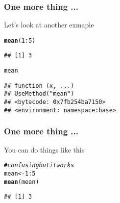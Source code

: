 \documentclass[12pt]{beamer}\usepackage[]{graphicx}\usepackage[]{color}
\makeatletter
\newcommand{\hlnum}[1]{\textcolor[rgb]{0.686,0.059,0.569}{#1}}%
\newcommand{\hlcom}[1]{\textcolor[rgb]{0.678,0.584,0.686}{\textit{#1}}}%
\newcommand{\hlopt}[1]{\textcolor[rgb]{0,0,0}{#1}}%
\newcommand{\hlstd}[1]{\textcolor[rgb]{0.345,0.345,0.345}{#1}}%
\newcommand{\hlkwb}[1]{\textcolor[rgb]{0.69,0.353,0.396}{#1}}%
\newcommand{\hlkwd}[1]{\textcolor[rgb]{0.737,0.353,0.396}{\textbf{#1}}}%
\newenvironment{kframe}{%
 \def\at@end@of@kframe{}%
 \ifinner\ifhmode%
  \def\at@end@of@kframe{\end{minipage}}%
  \begin{minipage}{\columnwidth}%
 \fi\fi%
 \def\FrameCommand##1{\hskip\@totalleftmargin \hskip-\fboxsep
 \colorbox{shadecolor}{##1}\hskip-\fboxsep
     \hskip-\linewidth \hskip-\@totalleftmargin \hskip\columnwidth}%
 \MakeFramed {\advance\hsize-\width
   \@totalleftmargin\z@ \linewidth\hsize
   \@setminipage}}%
 {\par\unskip\endMakeFramed%
 \at@end@of@kframe}
\newenvironment{knitrout}{}{} %
\makeatother
\begin{document}

\begin{frame}[fragile]
\frametitle{One more thing ...}

Let's look at another exmaple
\begin{knitrout}\footnotesize
{}\color{fgcolor}\begin{kframe}
\begin{alltt}
\hlkwd{mean}\hlstd{(}\hlnum{1}\hlopt{:}\hlnum{5}\hlstd{)}
\end{alltt}
\begin{verbatim}
## [1] 3
\end{verbatim}
\begin{alltt}
\hlstd{mean}
\end{alltt}
\begin{verbatim}
## function (x, ...) 
## UseMethod("mean")
## <bytecode: 0x7fb254ba7150>
## <environment: namespace:base>
\end{verbatim}
\end{kframe}
\end{knitrout}

\end{frame}


\begin{frame}[fragile]
\frametitle{One more thing ...}

You can do things like this
\begin{knitrout}\footnotesize
{}\color{fgcolor}\begin{kframe}
\begin{alltt}
\hlcom{# confusing but it works}
\hlstd{mean} \hlkwb{<-} \hlnum{1}\hlopt{:}\hlnum{5}
\hlkwd{mean}\hlstd{(mean)}
\end{alltt}
\begin{verbatim}
## [1] 3
\end{verbatim}
\end{kframe}
\end{knitrout}

\end{frame}

\end{document}

